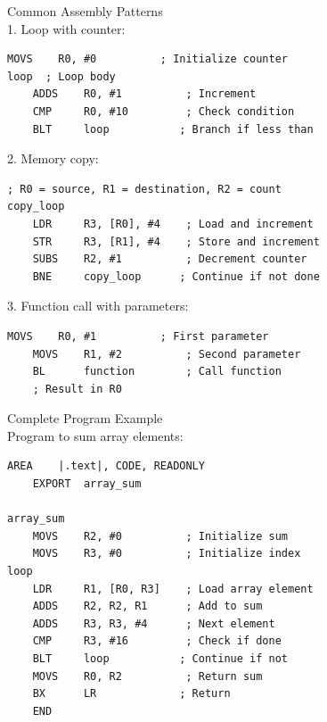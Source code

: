 \begin{code}{Common Assembly Patterns}\\
1. Loop with counter:
\begin{lstlisting}[language=armasm, style=basesmol]
    MOVS    R0, #0          ; Initialize counter
loop  ; Loop body
    ADDS    R0, #1          ; Increment
    CMP     R0, #10         ; Check condition
    BLT     loop           ; Branch if less than
\end{lstlisting}

2. Memory copy:
\begin{lstlisting}[language=armasm, style=basesmol]
    ; R0 = source, R1 = destination, R2 = count
copy_loop
    LDR     R3, [R0], #4    ; Load and increment
    STR     R3, [R1], #4    ; Store and increment
    SUBS    R2, #1          ; Decrement counter
    BNE     copy_loop      ; Continue if not done
\end{lstlisting}

3. Function call with parameters:
\begin{lstlisting}[language=armasm, style=basesmol]
    MOVS    R0, #1          ; First parameter
    MOVS    R1, #2          ; Second parameter
    BL      function        ; Call function
    ; Result in R0
\end{lstlisting}
\end{code}

\begin{example2}{Complete Program Example}\\
Program to sum array elements:
\begin{lstlisting}[language=armasm, style=basesmol]
    AREA    |.text|, CODE, READONLY
    EXPORT  array_sum
        
array_sum
    MOVS    R2, #0          ; Initialize sum
    MOVS    R3, #0          ; Initialize index
loop
    LDR     R1, [R0, R3]    ; Load array element
    ADDS    R2, R2, R1      ; Add to sum
    ADDS    R3, R3, #4      ; Next element
    CMP     R3, #16         ; Check if done
    BLT     loop           ; Continue if not
    MOVS    R0, R2          ; Return sum
    BX      LR             ; Return
    END
\end{lstlisting}
\end{example2}




